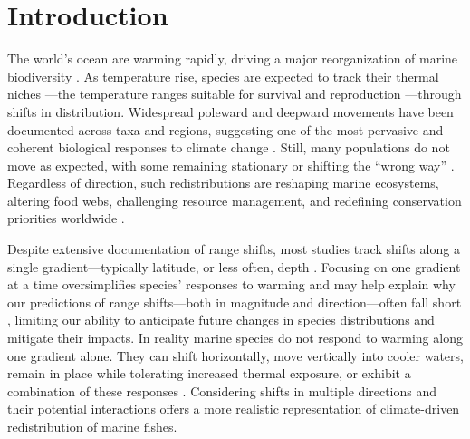 \documentclass[lineno,pdflatex,sn-nature]{sn-jnl}%
\theoremstyle{thmstyleone}%
\theoremstyle{thmstyletwo}%
\theoremstyle{thmstylethree}%
\begin{document}
\section{Introduction}\label{sec1}
The world's ocean are warming rapidly, driving a major reorganization of marine biodiversity \citep{ipcc_ocean_2019}. As temperature rise, species are expected to track their thermal niches ---the temperature ranges suitable for survival and reproduction \citep{grinnell_niche-relationships_1917}---through shifts in distribution. Widespread poleward and deepward movements have been documented across taxa and regions, suggesting one of the most pervasive and coherent biological responses to climate change \citep{parmesan_globally_2003, parmesan_ecological_2006, poloczanska_global_2013, poloczanska_responses_2016}. Still, many populations do not move as expected, with some remaining stationary or shifting the ``wrong way'' \citep{fuchs_wrong-way_2020,lawlor_mechanisms_2024}. Regardless of direction, such redistributions are reshaping marine ecosystems, altering food webs, challenging resource management, and redefining conservation priorities worldwide \citep{pinsky_preparing_2018, palacios-abrantes_climate_2025, pecl_biodiversity_2017}.

Despite extensive documentation of range shifts, most studies track shifts along a single gradient—typically latitude, or less often, depth \citep{nye_changing_2009, dulvy_climate_2008, pinsky_marine_2013}. Focusing on one gradient at a time oversimplifies species’ responses to warming and may help explain why our predictions of range shifts—both in magnitude and direction—often fall short \citep{lawlor_mechanisms_2024, fredston_reimagining_2025}, limiting our ability to anticipate future changes in species distributions and mitigate their impacts. In reality marine species do not respond to warming along one gradient alone. They can shift horizontally, move vertically into cooler waters, remain in place while tolerating increased thermal exposure, or exhibit a combination of these responses \citep{nye_changing_2009}. Considering shifts in multiple directions and their potential interactions offers a more realistic representation of climate-driven redistribution of marine fishes.

\end{document}
